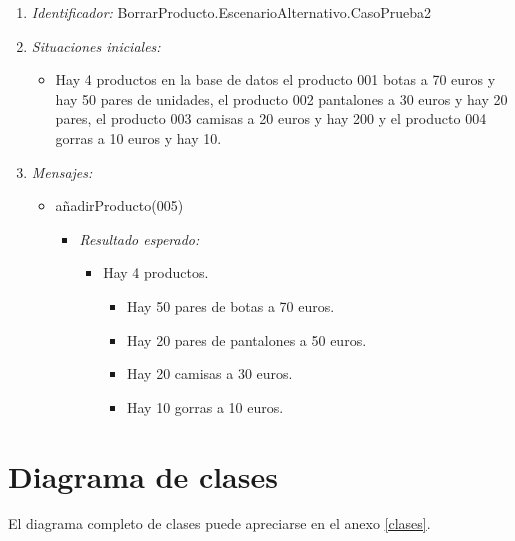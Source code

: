 \begin{enumerate}
\item {\it Identificador:} BorrarProducto.EscenarioAlternativo.CasoPrueba2
\item {\it Situaciones iniciales:}
  \begin{itemize}
  \item Hay 4 productos en la base de datos el producto 001 botas a 70 euros y hay 50 pares de unidades, el producto 002 pantalones a 30 euros y hay 20 pares, el producto 003 camisas a 20 euros y hay 200 y el producto 004 gorras a 10 euros y hay 10.
  \end{itemize}
\item {\it Mensajes:}
  \begin{itemize}
  \item añadirProducto(005)
    \begin{itemize}
    \item {\it Resultado esperado:}
      \begin{itemize}
      \item Hay 4 productos.
        \begin{itemize}
        \item Hay 50 pares de botas a 70 euros.
        \item Hay 20 pares de pantalones a 50 euros.
        \item Hay 20 camisas a 30 euros.
        \item Hay 10 gorras a 10 euros.
        \end{itemize}
      \end{itemize}
    \end{itemize}
  \end{itemize}
\end{enumerate}

\section{Diagrama de clases}

El diagrama completo de clases puede apreciarse en el anexo \ref{clases}.
